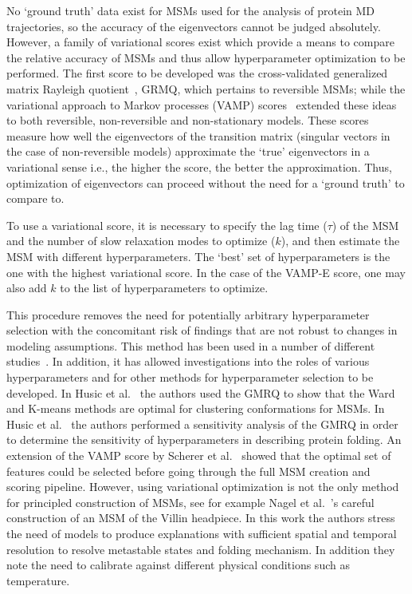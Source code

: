 \documentclass[journal=jacsat,manuscript=article]{achemso}
\begin{document}
No `ground truth' data exist for MSMs used for the analysis of protein MD trajectories, so the accuracy of the eigenvectors cannot be judged absolutely. However, a family of variational scores exist which provide a means to compare the relative accuracy of MSMs and thus allow hyperparameter optimization to be performed. The first score to be developed was the cross-validated generalized matrix Rayleigh quotient~\cite{mcgibbonVariationalCrossvalidationSlow2015}, GRMQ, which pertains to reversible MSMs; while the variational approach to Markov processes (VAMP) scores~\cite{wuVariationalApproachLearning2020c,scherer_variational_2019} extended these ideas to both reversible, non-reversible and non-stationary models. These scores measure how well the eigenvectors of the transition matrix (singular vectors in the case of non-reversible models) approximate the `true' eigenvectors in a variational sense i.e., the higher the score, the better the approximation. Thus, optimization of eigenvectors can proceed without the need for a `ground truth' to compare to.   

To use a variational score, it is necessary to specify the lag time ($\tau$) of the MSM and the number of slow relaxation modes to optimize ($k$), and then estimate the MSM with different hyperparameters. The `best' set of hyperparameters is the one with the highest variational score. In the case of the VAMP-E score, one may also add $k$ to the list of hyperparameters to optimize. 

This procedure removes the need for potentially arbitrary hyperparameter selection with the concomitant risk of findings that are not robust to changes in modeling assumptions. This method has been used in a number of different studies~\cite{A_Minimum_2018, Adaptive_M2020, High-Resol2019, Maximizing2018, Modeling_t2017, Optimized_2016, Quantitati2018, VAMPnets_f2018, Variationa2018, Ward_Clust2017}. In addition, it has allowed investigations into the roles of various hyperparameters and for other methods for hyperparameter selection to be developed. In Husic et al.~
\cite{Ward_Clust2017} the authors used the GMRQ to show that the Ward and K-means methods are optimal for clustering conformations for MSMs. In Husic et al.~\cite{Optimized_2016} the authors performed a sensitivity analysis of the GMRQ  in order to determine the sensitivity of hyperparameters in describing protein folding.  An extension of the VAMP score by Scherer et al.~\cite{scherer_variational_2019} showed that the optimal set of features could be selected before going through the full MSM creation and scoring pipeline. However, using variational optimization is not the only method for principled construction of MSMs, see for example Nagel et al.~\cite{nagelSelectingFeaturesMarkov2023, nagelBenchmarkMarkovState2023}'s careful construction of an MSM of the Villin headpiece. In this work the authors stress the need of models to produce explanations with sufficient spatial and temporal resolution to resolve metastable states and folding mechanism. In addition they note the need to calibrate against different physical conditions such as temperature. 
\end{document}
